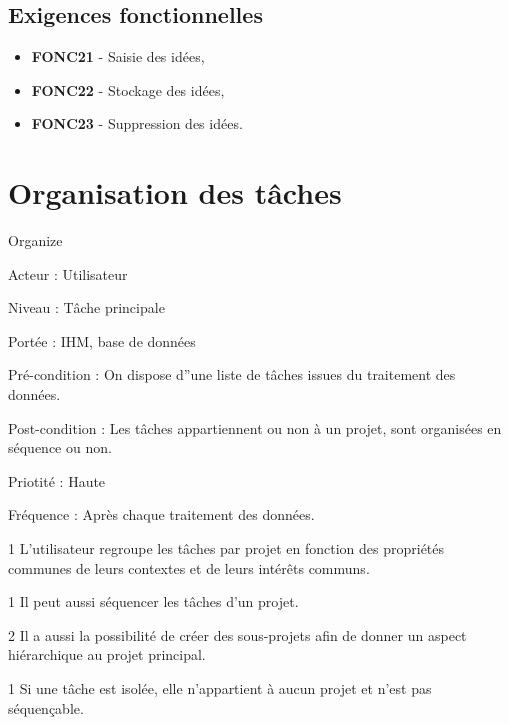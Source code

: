 \subsection{Exigences fonctionnelles}

\begin{itemize}	\renewcommand{\labelitemi}{}
\item \textbf{FONC21} - Saisie des idées,
\item \textbf{FONC22} - Stockage des idées,
\item \textbf{FONC23} - Suppression des idées.
\end{itemize}


\section{Organisation des tâches}
	\begin{usecase}{Organize} 
		\begin{information}
			\item[Acteur :] Utilisateur
			\item[Niveau :] Tâche principale
			\item[Portée :] IHM, base de données
			\item[Pré-condition :] On dispose d''une liste de tâches issues du traitement des données.
			\item[Post-condition :] Les tâches appartiennent ou non à un projet, sont organisées en séquence ou non.
			\item[Priotité :] Haute
			\item[Fréquence :] Après chaque traitement des données.
		\end{information}
		\begin{scenario}
			\item[1] L'utilisateur regroupe les tâches par projet en fonction des propriétés communes de leurs contextes et de leurs intérêts communs.
			\item[1] Il peut aussi séquencer les tâches d'un projet. 
			\item[2] Il a aussi la possibilité de créer des sous-projets afin de donner un aspect hiérarchique au projet principal.
		\end{scenario}
		\begin{extension}
			\item[1]Si une tâche est isolée, elle n'appartient à aucun projet et n'est pas séquençable.
		\end{extension}
	\end{usecase}
		

